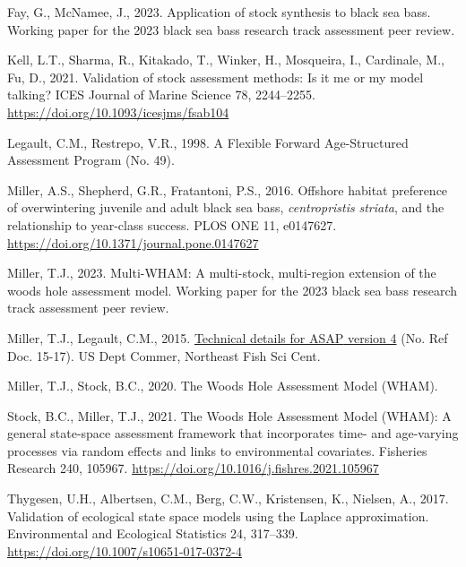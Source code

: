 \documentclass[
]{article}
\newlength{\cslhangindent}
\newlength{\cslentryspacingunit} %
\newenvironment{CSLReferences}[2] %
 {%
  \setlength{\parindent}{0pt}
  \ifodd #1
  \let\oldpar\par
  \def\par{\hangindent=\cslhangindent\oldpar}
  \fi
  \setlength{\parskip}{#2\cslentryspacingunit}
 }%
 {}
\begin{document}
\hypertarget{refs}{}
\begin{CSLReferences}{1}{0}
\leavevmode{}%
Fay, G., McNamee, J., 2023. Application of stock synthesis to black sea bass. Working paper for the 2023 black sea bass research track assessment peer review.

\leavevmode{}%
Kell, L.T., Sharma, R., Kitakado, T., Winker, H., Mosqueira, I., Cardinale, M., Fu, D., 2021. Validation of stock assessment methods: Is it me or my model talking? ICES Journal of Marine Science 78, 2244--2255. \url{https://doi.org/10.1093/icesjms/fsab104}

\leavevmode{}%
Legault, C.M., Restrepo, V.R., 1998. A {Flexible Forward Age}-{Structured Assessment Program} (No. 49).

\leavevmode{}%
Miller, A.S., Shepherd, G.R., Fratantoni, P.S., 2016. Offshore habitat preference of overwintering juvenile and adult black sea bass, \emph{centropristis} \emph{striata}, and the relationship to year-class success. {PLOS} {ONE} 11, e0147627. \url{https://doi.org/10.1371/journal.pone.0147627}

\leavevmode{}%
Miller, T.J., 2023. {Multi-WHAM}: A multi-stock, multi-region extension of the woods hole assessment model. Working paper for the 2023 black sea bass research track assessment peer review.

\leavevmode{}%
Miller, T.J., Legault, C.M., 2015. \href{https://doi:10.7289/V57W695G}{Technical details for {ASAP} version 4} (No. Ref Doc. 15-17). {US Dept Commer, Northeast Fish Sci Cent}.

\leavevmode{}%
Miller, T.J., Stock, B.C., 2020. The {Woods Hole Assessment Model} ({WHAM}).

\leavevmode{}%
Stock, B.C., Miller, T.J., 2021. The {Woods Hole Assessment Model} ({WHAM}): A general state-space assessment framework that incorporates time- and age-varying processes via random effects and links to environmental covariates. Fisheries Research 240, 105967. \url{https://doi.org/10.1016/j.fishres.2021.105967}

\leavevmode{}%
Thygesen, U.H., Albertsen, C.M., Berg, C.W., Kristensen, K., Nielsen, A., 2017. {Validation of ecological state space models using the Laplace approximation}. Environmental and Ecological Statistics 24, 317--339. \url{https://doi.org/10.1007/s10651-017-0372-4}


\end{CSLReferences}
\end{document}
